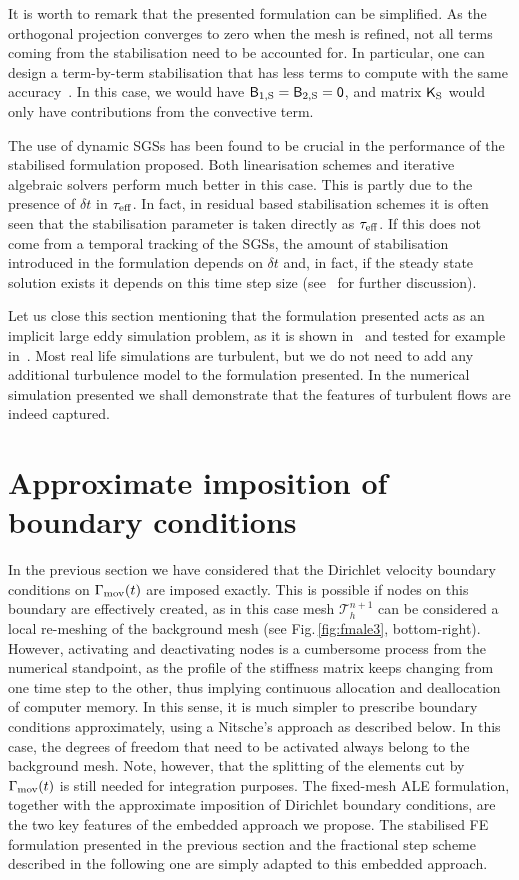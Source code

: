 \documentclass[11pt,a4paper,oneside,reqno]{amsart}
\newcommand{\Figu}[1]{Fig.\,\ref{fig:#1}}
\def\mB{\hbox{{\sffamily B}}}
\def\mK{\hbox{{\sffamily K}}}
\def\mzero{\hbox{{\sffamily 0}}}
\begin{document}
It is worth to remark that the presented formulation can be simplified. As the orthogonal projection converges to zero when the mesh is refined, not all terms coming from the stabilisation need to be accounted for. In particular, one can design a term-by-term stabilisation that has less terms to compute with the same accuracy~\cite{castillo-codina-2019}. In this case, we would have $\mB_{1,{\rm S}}  = \mB_{2,{\rm S}} = \mzero$, and matrix $\mK_{\rm S}$ would only have contributions from the convective term. 

The use of dynamic SGSs has been found to be crucial in the performance of the stabilised formulation proposed. Both linearisation schemes and iterative algebraic solvers perform much better in this case. This is partly due to the presence of $\delta t$ in $\tau_{\rm eff}$. In fact, in residual based stabilisation schemes it is often seen that the stabilisation parameter is taken directly as $\tau_{\rm eff}$. If this does not come from a temporal tracking of the SGSs, the amount of stabilisation introduced in the formulation depends on $\delta t$ and, in fact, if the steady state solution exists it depends on this time step size (see~\cite{codinap1} for further discussion).

Let us close this section mentioning that the formulation presented acts as an implicit large eddy simulation problem, as it is shown in~\cite{Guasch-codina-2013} and tested for example in~\cite{COLOMES201532}. Most real life simulations are turbulent, but we do not need to add any additional turbulence model to the formulation presented. In the numerical simulation presented we shall demonstrate that the features of turbulent flows are indeed captured.

\section{Approximate imposition of boundary conditions}\label{sec:bcs}

In the previous section we have considered that the Dirichlet velocity boundary conditions on $\Gamma_{\rm mov}(t)$ are imposed exactly. This is possible if nodes on this boundary are effectively created, as in this case mesh $\mathcal{T}_h^{n+1}$ can be considered a local re-meshing  of the background mesh (see \Figu{fmale3}, bottom-right). However, activating and deactivating nodes is a cumbersome process from the numerical standpoint, as the profile of the stiffness matrix keeps changing from one time step to the other, thus implying continuous allocation and deallocation of computer memory. In this sense, it is much simpler to prescribe boundary conditions approximately, using a Nitsche's approach as described below. In this case, the degrees of freedom that need to be activated always belong to the background mesh. Note, however, that the splitting of the elements cut by $\Gamma_{\rm mov}(t)$ is still needed for integration purposes. The fixed-mesh ALE formulation, together with the approximate imposition of Dirichlet boundary conditions, are the two key features of the embedded approach we propose. The stabilised FE formulation presented in the previous section and the fractional step scheme described in the following one are simply adapted to this embedded approach.
\end{document}
